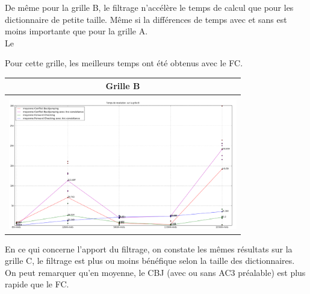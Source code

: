 \documentclass[a4paper,12pt]{report}
\begin{document}
\begin{enumerate}
\begin{table}[!h]
\begin{center}
\begin{tabular}{|c|}
\end{tabular}
\end{center}
\end{table}

De même pour la grille B, le filtrage n'accélère le temps de calcul que pour les dictionnaire de petite taille. Même si la différences de temps avec et sans est moins importante que pour la grille A.\\

Le

Pour cette grille, les meilleurs temps ont été obtenus avec le FC.\\

\begin{table}[!h]
\begin{center}
\begin{tabular}{|c|}

\hline
Grille B \\
\hline 
\\
\includegraphics[width=10cm]{Grille_B.png} \\
\hline


\end{tabular}
\end{center}
\end{table}

En ce qui concerne l'apport du filtrage, on constate les mêmes résultats sur la grille C, le filtrage est plus ou moins bénéfique selon la taille des dictionnaires. \\

On peut remarquer qu'en moyenne, le CBJ (avec ou sans AC3 préalable) est plus rapide que le FC.\\

\begin{table}[!h]
\begin{center}
\begin{tabular}{|c|}


\end{tabular}
\end{center}
\end{table}
\end{enumerate}
\end{document}
